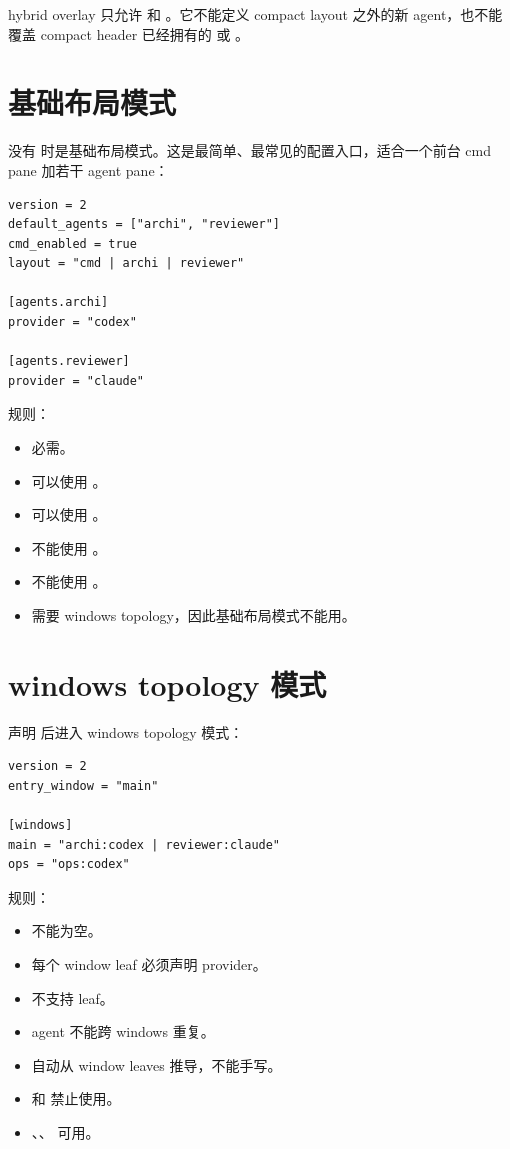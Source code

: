 hybrid overlay 只允许  和 。它不能定义 compact layout 之外的新 agent，也不能覆盖 compact header 已经拥有的  或 。

\section{基础布局模式}

没有  时是基础布局模式。这是最简单、最常见的配置入口，适合一个前台 cmd pane 加若干 agent pane：

\begin{lstlisting}
version = 2
default_agents = ["archi", "reviewer"]
cmd_enabled = true
layout = "cmd | archi | reviewer"

[agents.archi]
provider = "codex"

[agents.reviewer]
provider = "claude"
\end{lstlisting}

规则：

\begin{itemize}
  \item {} 必需。
  \item 可以使用 。
  \item 可以使用 。
  \item 不能使用 。
  \item 不能使用 。
  \item {} 需要 windows topology，因此基础布局模式不能用。
\end{itemize}

\section{windows topology 模式}

声明  后进入 windows topology 模式：

\begin{lstlisting}
version = 2
entry_window = "main"

[windows]
main = "archi:codex | reviewer:claude"
ops = "ops:codex"
\end{lstlisting}

规则：

\begin{itemize}
  \item {} 不能为空。
  \item 每个 window leaf 必须声明 provider。
  \item 不支持  leaf。
  \item agent 不能跨 windows 重复。
  \item {} 自动从 window leaves 推导，不能手写。
  \item {} 和  禁止使用。
  \item {}、、 可用。
\end{itemize}

